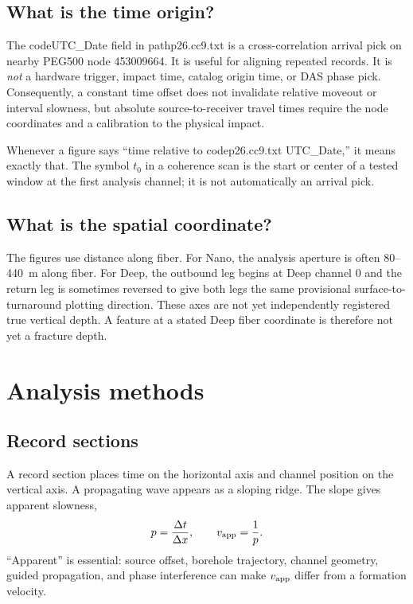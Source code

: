 \documentclass[11pt]{article}
\begin{document}
\subsection{What is the time origin?}

The code{UTC\_Date} field in path{p26.cc9.txt} is a cross-correlation arrival
pick on nearby PEG500 node 453009664.  It is useful for aligning repeated
records.  It is \emph{not} a hardware trigger, impact time, catalog origin time,
or DAS phase pick.  Consequently, a constant time offset does not invalidate
relative moveout or interval slowness, but absolute source-to-receiver travel
times require the node coordinates and a calibration to the physical impact.

Whenever a figure says ``time relative to code{p26.cc9.txt UTC\_Date},'' it
means exactly that.  The symbol $t_0$ in a coherence scan is the start or center
of a tested window at the first analysis channel; it is not automatically an
arrival pick.

\subsection{What is the spatial coordinate?}

The figures use distance along fiber.  For Nano, the analysis aperture is often
80--440~m along fiber.  For Deep, the outbound leg begins at Deep channel 0 and
the return leg is sometimes reversed to give both legs the same provisional
surface-to-turnaround plotting direction.  These axes are not yet independently
registered true vertical depth.  A feature at a stated Deep fiber coordinate is
therefore not yet a fracture depth.

\section{Analysis methods}

\subsection{Record sections}

A record section places time on the horizontal axis and channel position on the
vertical axis.  A propagating wave appears as a sloping ridge.  The slope gives
apparent slowness,
\begin{equation}
p=\frac{\Delta t}{\Delta x}, \qquad v_{\rm app}=\frac{1}{p}.
\end{equation}
``Apparent'' is essential: source offset, borehole trajectory, channel geometry,
guided propagation, and phase interference can make $v_{\rm app}$ differ from a
formation velocity.
\end{document}
